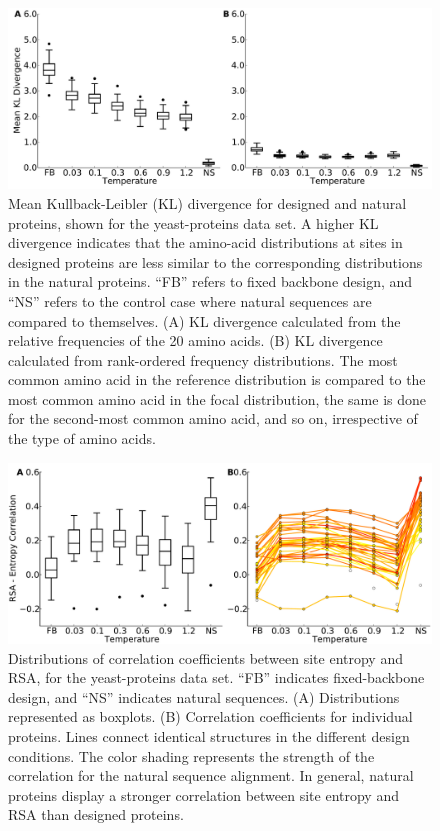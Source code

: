 \documentclass[12pt]{article}
\begin{document}
\begin{figure}[H]
\centerline{\includegraphics[width = 6in]{figures/Mean_KL_vs_Temp_Boxplot.pdf}}
\caption{Mean Kullback-Leibler (KL) divergence for designed and natural proteins, shown for the yeast-proteins data set. A higher KL divergence indicates that the amino-acid distributions at sites in designed proteins are less similar to the corresponding distributions in the natural proteins. ``FB'' refers to fixed backbone design, and ``NS'' refers to the control case where natural sequences are compared to themselves. (A) KL divergence calculated from the relative frequencies of the 20 amino acids. (B) KL divergence calculated from rank-ordered frequency distributions. The most common amino acid in the reference distribution is compared to the most common amino acid in the focal distribution, the same is done for the second-most common amino acid, and so on, irrespective of the type of amino acids.}
\label{AADisFig1}
\end{figure}


\begin{figure}[H]
\centerline{\includegraphics[width = 6in]{figures/Cor_Mean_Entropy_RSA_Combination_Plot.pdf}}
\caption{Distributions of correlation coefficients between site entropy and RSA, for the yeast-proteins data set. ``FB'' indicates fixed-backbone design, and ``NS'' indicates natural sequences. (A) Distributions represented as boxplots. (B) Correlation coefficients for individual proteins. Lines connect identical structures in the different design conditions. The color shading represents the strength of the correlation for the natural sequence alignment. In general, natural proteins display a stronger correlation between site entropy and RSA than designed proteins.}
\label{Correlation_figure}
\end{figure}
\end{document}
